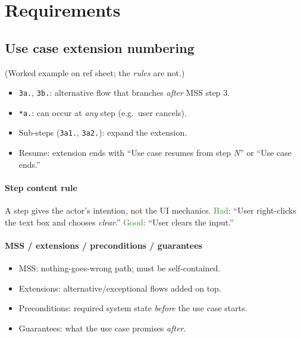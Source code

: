 \section{Requirements}

\subsection{Use case extension numbering}
(Worked example on ref sheet; the \emph{rules} are not.)
\begin{itemize}
  \item \textcolor{Bittersweet}{\texttt{3a.}}, \texttt{3b.}: alternative flow that branches \emph{after} MSS step 3.
  \item \textcolor{Bittersweet}{\texttt{*a.}}: can occur at \emph{any} step (e.g.\ user cancels).
  \item \textcolor{Bittersweet}{Sub-steps} (\texttt{3a1.}, \texttt{3a2.}): expand the extension.
  \item \textcolor{Bittersweet}{Resume}: extension ends with ``Use case resumes from step \emph{N}'' or ``Use case ends.''
\end{itemize}

\paragraph{Step content rule}
A step gives the actor's \textcolor{Bittersweet}{intention}, not the UI mechanics. \textcolor{ForestGreen}{Bad}: ``User right-clicks the text box and chooses \emph{clear}.'' \textcolor{ForestGreen}{Good}: ``User clears the input.''

\paragraph{MSS / extensions / preconditions / guarantees}
\begin{itemize}
  \item \textcolor{Bittersweet}{MSS}: nothing-goes-wrong path; must be self-contained.
  \item \textcolor{Bittersweet}{Extensions}: alternative/exceptional flows added on top.
  \item \textcolor{Bittersweet}{Preconditions}: required system state \emph{before} the use case starts.
  \item \textcolor{Bittersweet}{Guarantees}: what the use case promises \emph{after}.
\end{itemize}

